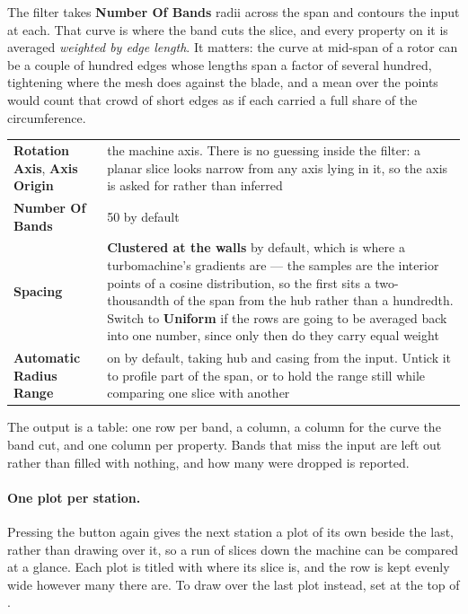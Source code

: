 \documentclass[11pt,a4paper]{article}
\newcommand{\prop}[1]{\textbf{#1}}          %
\newcommand{\menu}[1]{\textbf{#1}}          %
\begin{document}
The filter takes \prop{Number Of Bands} radii across the span and contours the
input at each. That curve is where the band cuts the slice, and every property on
it is averaged \emph{weighted by edge length}. It matters: the curve at mid-span
of a rotor can be a couple of hundred edges whose lengths span a factor of
several hundred, tightening where the mesh does against the blade, and a mean
over the points would count that crowd of short edges as if each carried a full
share of the circumference.

\begin{center}
\begin{tabular}{@{}L{40mm}L{86mm}@{}}
\toprule
\prop{Rotation Axis}, \prop{Axis Origin} & the machine axis. There is no guessing
  inside the filter: a planar slice looks narrow from any axis lying in it, so
  the axis is asked for rather than inferred \\
\prop{Number Of Bands} & 50 by default \\
\prop{Spacing} & \menu{Clustered at the walls} by default, which is where a
  turbomachine's gradients are --- the samples are the interior points of a
  cosine distribution, so the first sits a two-thousandth of the span from the
  hub rather than a hundredth. Switch to \menu{Uniform} if the rows are going to
  be averaged back into one number, since only then do they carry equal weight \\
\prop{Automatic Radius Range} & on by default, taking hub and casing from the
  input. Untick it to profile part of the span, or to hold the range still while
  comparing one slice with another \\
\bottomrule
\end{tabular}
\end{center}

The output is a table: one row per band, a  column, a 
column for the curve the band cut, and one column per property. Bands that miss
the input are left out rather than filled with nothing, and how many were dropped
is reported.

\paragraph{One plot per station.} Pressing the button again gives the next
station a plot of its own beside the last, rather than drawing over it, so a run
of slices down the machine can be compared at a glance. Each plot is titled with
where its slice is, and the row is kept evenly wide however many there are. To
draw over the last plot instead, set  at the top of
.
\end{document}

